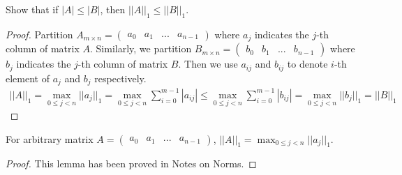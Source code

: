 \documentclass[11pt,a4paper]{article}
\begin{document}
\newpage
\setcounter{section}{11}
\section{}
\subsection{}
Show that if $|A| \leq |B|$, then $||A||_1\leq||B||_1$.
\begin{proof}
    Partition 
    $A_{m \times n} = \left( \begin{array}{c|c|c|c} a_0 & a_1 & ... & a_{n-1} \end{array} \right)$
    where $a_j$ indicates the $j$-th column of matrix $A$. 
    Similarly, we partition 
    $B_{m \times n} = \left( \begin{array}{c|c|c|c} b_0 & b_1 & ... & b_{n-1} \end{array} \right)$
    where $b_j$ indicates the $j$-th column of matrix $B$. 
    Then we use $a_{ij}$ and $b_{ij}$ to denote $i$-th element of $a_j$ and $b_j$ respectively.
    \begin{align}
        || A ||_1 
        = \max_{0 \leq j < n} || a_j ||_1 
        = \max_{0 \leq j < n} \sum_{i=0}^{m-1} |a_{ij}| 
        \leq \max_{0 \leq j < n} \sum_{i=0}^{m-1} |b_{ij}| 
        = \max_{0 \leq j < n} || b_{j} ||_1 
        = || B ||_1 
    \end{align}
\end{proof}
\begin{lemma}
    For arbitrary matrix
    $A = \left( \begin{array}{c|c|c|c} a_0 & a_1 & ... & a_{n-1} \end{array} \right)$, 
    $|| A ||_1 = \max_{0 \leq j < n} || a_j ||_1 $.
\begin{proof}
    This lemma has been proved in Notes on Norms.    
\end{proof}
\end{lemma}
\end{document}
